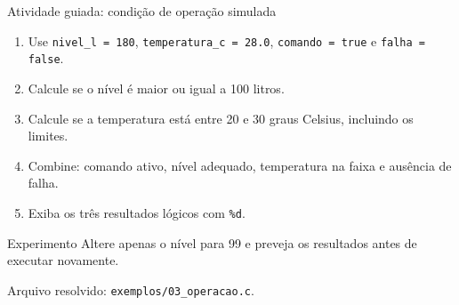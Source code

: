 \begin{frame}{Atividade guiada: condição de operação simulada}
\begin{enumerate}
\item Use \texttt{nivel\_l = 180}, \texttt{temperatura\_c = 28.0}, \texttt{comando = true} e \texttt{falha = false}.
\item Calcule se o nível é maior ou igual a 100 litros.
\item Calcule se a temperatura está entre 20 e 30 graus Celsius, incluindo os limites.
\item Combine: comando ativo, nível adequado, temperatura na faixa e ausência de falha.
\item Exiba os três resultados lógicos com \texttt{\%d}.
\end{enumerate}
\begin{block}{Experimento}
Altere apenas o nível para 99 e preveja os resultados antes de executar novamente.
\end{block}
\small Arquivo resolvido: \texttt{exemplos/03\_operacao.c}.
\end{frame}
